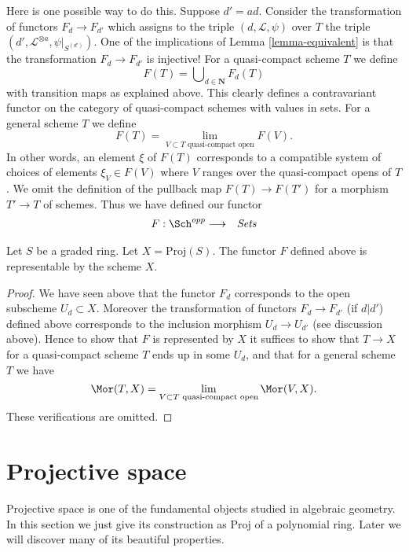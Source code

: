 \medskip\noindent
Here is one possible way to do this. Suppose $d' = ad$.
Consider the transformation of functors $F_d \to F_{d'}$
which assigns to the triple $(d, \mathcal{L}, \psi)$ over
$T$ the triple $(d', \mathcal{L}^{\otimes a}, \psi|_{S^{(d')}})$.
One of the implications of Lemma \ref{lemma-equivalent} is that the
transformation $F_d \to F_{d'}$ is injective!
For a quasi-compact scheme $T$ we define
$$
F(T) = \bigcup\nolimits_{d \in \mathbf{N}} F_d(T)
$$
with transition maps as explained above. This clearly defines a
contravariant functor on the category of quasi-compact schemes
with values in sets. For a general scheme
$T$ we define
$$
F(T)
=
\lim_{V \subset T\text{ quasi-compact open}} F(V).
$$
In other words, an element $\xi$ of $F(T)$ corresponds to a compatible system
of choices of elements $\xi_V \in F(V)$ where $V$ ranges over the
quasi-compact opens of $T$.
We omit the definition of the pullback map $F(T) \to F(T')$
for a morphism $T' \to T$ of schemes.
Thus we have defined our functor
\begin{eqnarray*}
F : \Sch^{opp} & \longrightarrow & \textit{Sets}
\end{eqnarray*}

\begin{lemma}
\label{lemma-proj-functor}
Let $S$ be a graded ring.
Let $X = \text{Proj}(S)$.
The functor $F$ defined above is representable by the scheme $X$.
\end{lemma}

\begin{proof}
We have seen above that the functor $F_d$ corresponds to the
open subscheme $U_d \subset X$. Moreover the transformation
of functors $F_d \to F_{d'}$ (if $d | d'$) defined above
corresponds to the inclusion morphism $U_d \to U_{d'}$
(see discussion above). Hence to show that $F$ is represented
by $X$ it suffices to show that $T \to X$ for a quasi-compact
scheme $T$ ends up in some $U_d$, and that for a general scheme
$T$ we have
$$
\Mor(T, X)
=
\lim_{V \subset T\text{ quasi-compact open}} \Mor(V, X).
$$
These verifications are omitted.
\end{proof}







\section{Projective space}
\label{section-projective-space}

\noindent
Projective space is one of the fundamental objects studied in
algebraic geometry. In this section we just give its construction
as $\text{Proj}$ of a polynomial ring. Later we will discover many
of its beautiful properties.

